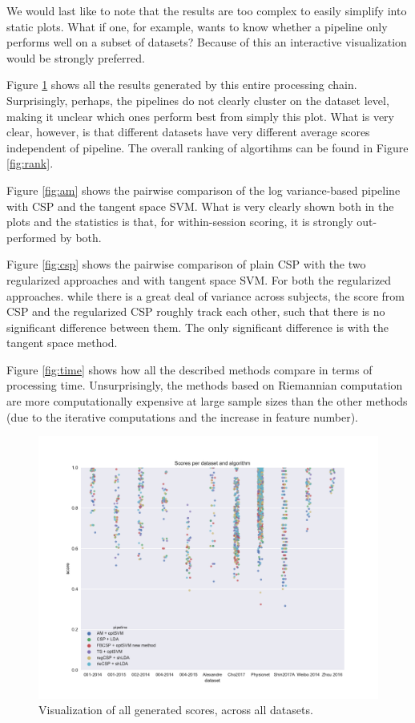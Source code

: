 We would last like to note that the results are too complex to easily
simplify into static plots. What if one, for example, wants to know
whether a pipeline only performs well on a subset of datasets? Because
of this an interactive visualization would be strongly preferred.

Figure \ref{fig:all} shows all the results generated by this entire
processing chain. Surprisingly, perhaps, the pipelines do not clearly
cluster on the dataset level, making it unclear which ones perform
best from simply this plot. What is very clear, however, is that
different datasets have very different average scores
independent of pipeline. The overall ranking of algortihms can be found in Figure \ref{fig:rank}.

Figure \ref{fig:am} shows the pairwise comparison of the log
variance-based pipeline with CSP and the tangent space SVM. What is
very clearly shown both in the plots and the statistics is that, for
within-session scoring, it is strongly out-performed by both.

Figure \ref{fig:csp} shows the pairwise comparison of 
plain CSP with the two regularized approaches and with
tangent space SVM. For both the regularized approaches. while there is
a great deal of variance across subjects, the score from CSP and the
regularized CSP roughly track each other, such that there is no
significant difference between them. The only significant difference
is with the tangent space method.

Figure \ref{fig:time} shows how all the described methods compare in
terms of processing time. Unsurprisingly, the methods based on
Riemannian computation are more computationally expensive at large
sample sizes than the other methods (due to the iterative computations
and the increase in feature number). 

\begin{figure}
    \centering
    \includegraphics[width=\textwidth]{Figures/full_scores.pdf}
    \caption{Visualization of all generated scores, across all datasets.}
    \label{fig:all}
\end{figure}


